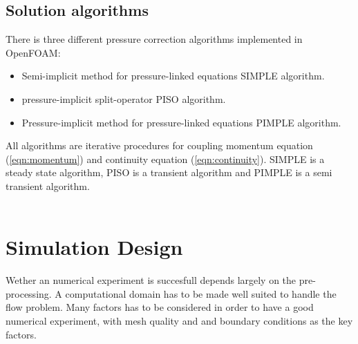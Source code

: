 \documentclass[a4paper, 12pt]{report}
\begin{document}
\section{Solution algorithms}
There is three different pressure correction algorithms implemented in OpenFOAM:
\begin{itemize}
\item Semi-implicit method for pressure-linked equations SIMPLE algorithm.
\item pressure-implicit split-operator PISO algorithm.
\item Pressure-implicit method for pressure-linked equations PIMPLE algorithm.
\end{itemize}
All algorithms are iterative procedures for coupling momentum equation (\ref{eqn:momentum}) and continuity equation (\ref{eqn:continuity}).
SIMPLE is a steady state algorithm, PISO is a transient algorithm and PIMPLE is a semi transient algorithm.\\
\\

\chapter{Simulation Design}
Wether an numerical experiment is succesfull depends largely on the pre-processing. A computational domain has to be made well suited to handle the flow problem. Many factors has to be considered in order to have a good numerical experiment, with mesh quality and and boundary conditions as the key factors.
\end{document}
